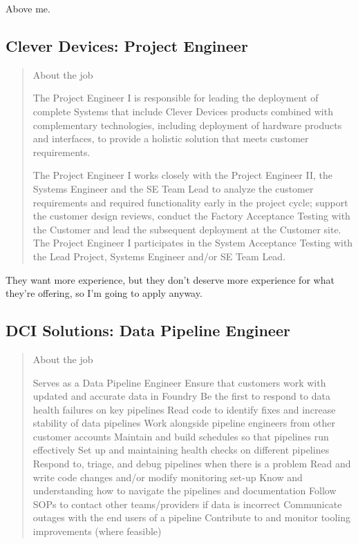 \documentclass[
	letterpaper, %
	12pt, %
]{CSSullivanBusinessReport}
\begin{document}
Above me. 



\subsection[Clever Devices]{Clever Devices: Project Engineer}

\begin{quote}
	About the job
	
	The Project Engineer I is responsible for leading the deployment of complete Systems that include Clever Devices products combined with complementary technologies, including deployment of hardware products and interfaces, to provide a holistic solution that meets customer requirements.

	The Project Engineer I works closely with the Project Engineer II, the Systems Engineer and the SE Team Lead to analyze the customer requirements and required functionality early in the project cycle; support the customer design reviews, conduct the Factory Acceptance Testing with the Customer and lead the subsequent deployment at the Customer site. The Project Engineer I participates in the System Acceptance Testing with the Lead Project, Systems Engineer and/or SE Team Lead.

\end{quote}

They want more experience, but they don't deserve more experience for what they're offering, so I'm going to apply anyway.


\subsection[DCI Solutions]{DCI Solutions: Data Pipeline Engineer}

\begin{quote}
	About the job
	
    Serves as a Data Pipeline Engineer
    Ensure that customers work with updated and accurate data in Foundry
    Be the first to respond to data health failures on key pipelines
    Read code to identify fixes and increase stability of data pipelines
    Work alongside pipeline engineers from other customer accounts
    Maintain and build schedules so that pipelines run effectively
    Set up and maintaining health checks on different pipelines
    Respond to, triage, and debug pipelines when there is a problem
    Read and write code changes and/or modify monitoring set-up
    Know and understanding how to navigate the pipelines and documentation
    Follow SOPs to contact other teams/providers if data is incorrect
    Communicate outages with the end users of a pipeline
    Contribute to and monitor tooling improvements (where feasible)

\end{quote}
\end{document}
